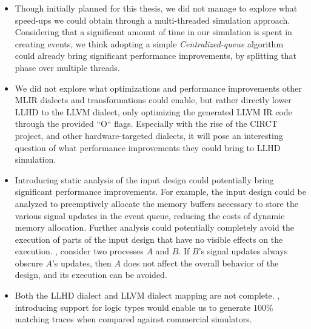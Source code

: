 \begin{itemize}
  \item Though initially planned for this thesis, we did not manage to explore what speed-ups we could obtain through a multi-threaded simulation approach. Considering that a significant amount of time in our simulation is spent in creating events, we think adopting a simple \textit{Centralized-queue} algorithm~\cite{Ashenden1994} could already bring significant performance improvements, by splitting that phase over multiple threads.
  \item We did not explore what optimizations and performance improvements other MLIR dialects and transformations could enable, but rather directly lower LLHD to the LLVM dialect, only optimizing the generated LLVM IR code through the provided “O“ flags. Especially with the rise of the CIRCT project, and other hardware-targeted dialects, it will pose an interesting question of what performance improvements they could bring to LLHD simulation.
  \item Introducing static analysis of the input design could potentially bring significant performance improvements. For example, the input design could be analyzed to preemptively allocate the memory buffers necessary to store the various signal updates in the event queue, reducing the costs of dynamic memory allocation. Further analysis could potentially completely avoid the execution of parts of the input design that have no visible effects on the execution. \Eg, consider two processes $A$ and $B$. If $B$'s signal updates always obscure $A$'s updates, then $A$ does not affect the overall behavior of the design, and its execution can be avoided.
  \item Both the LLHD dialect and LLVM dialect mapping are not complete. \Eg, introducing support for logic types would enable us to generate $100\%$ matching traces when compared against commercial simulators.
\end{itemize}



